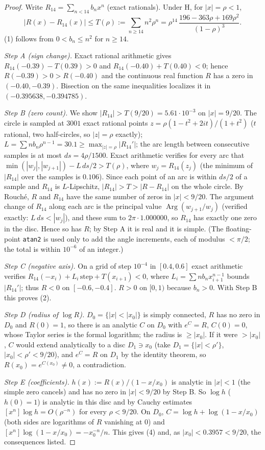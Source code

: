 \documentclass[11pt]{article}
\theoremstyle{definition}
\theoremstyle{remark}
\begin{document}
\begin{proof}
Write $R_{14}=\sum_{n<14}b_nx^n$ (exact rationals). Under H, for $|x|=\rho<1$,
\[
|R(x)-R_{14}(x)|\le T(\rho):=\sum_{n\ge14}n^2\rho^n=\rho^{14}\,\frac{196-363\rho+169\rho^2}{(1-\rho)^3}.
\]
(1) follows from $0<b_n\le n^2$ for $n\ge14$.

\emph{Step A (sign change).} Exact rational arithmetic gives $R_{14}(-0.39)-T(0.39)>0$ and $R_{14}(-0.40)+T(0.40)<0$; hence $R(-0.39)>0>R(-0.40)$ and the continuous real function $R$ has a zero in $(-0.40,-0.39)$. Bisection on
the same inequalities localizes it in $(-0.395638,-0.394785)$.

\emph{Step B (zero count).} We show $|R_{14}|>T(9/20)=5.61\cdot10^{-3}$ on $|x|=9/20$. The circle is sampled at $3001$ exact rational points $z=\rho(1-t^2+2it)/(1+t^2)$ ($t$ rational, two half-circles, so $|z|=\rho$ exactly);
$L=\sum nb_n\rho^{n-1}=30.1\ge\max_{|z|=\rho}|R_{14}'|$; the arc length between consecutive samples is at most $ds=4\rho/1500$. Exact arithmetic verifies for every arc that
$\min(|w_j|,|w_{j+1}|)-L\,ds/2>T(\rho)$, where $w_j=R_{14}(z_j)$ (the minimum of $|R_{14}|$ over the samples is $0.106$). Since each point of an arc is within $ds/2$ of a sample and $R_{14}$ is $L$-Lipschitz, $|R_{14}|>T>|R-R_{14}|$ on the whole circle.
By Rouch\'e, $R$ and $R_{14}$ have the same number of zeros in $|x|<9/20$. The argument change of $R_{14}$ along each arc is the principal value $\operatorname{Arg}(w_{j+1}/w_j)$ (verified exactly: $L\,ds<|w_j|$), and these sum to $2\pi\cdot1.000000$, so $R_{14}$ has exactly one zero in the
disc. Hence so has $R$; by Step A it is real and it is simple. (The floating-point \texttt{atan2} is used only to add the angle increments, each of modulus $<\pi/2$; the total is within $10^{-6}$ of an integer.)

\emph{Step C (negative axis).} On a grid of step $10^{-4}$ in $[0.4,0.6]$ exact arithmetic verifies $R_{14}(-x_i)+L_i\,\text{step}+T(x_{i+1})<0$, where $L_i=\sum nb_nx_{i+1}^{n-1}$ bounds $|R_{14}'|$; thus $R<0$ on $[-0.6,-0.4]$. $R>0$ on $[0,1)$ because $b_n>0$. With Step B this proves (2).

\emph{Step D (radius of $\log R$).} $D_0=\{|x|<|x_0|\}$ is simply connected, $R$ has no zero in $D_0$ and $R(0)=1$, so there is an analytic $C$ on $D_0$ with $e^{C}=R$, $C(0)=0$, whose Taylor series is the formal logarithm; the radius is $\ge|x_0|$.
If it were $>|x_0|$, $C$ would extend analytically to a disc $D_1\ni x_0$ (take $D_1=\{|x|<\rho'\}$, $|x_0|<\rho'<9/20$), and $e^{C}=R$ on $D_1$ by the identity theorem, so $R(x_0)=e^{C(x_0)}\ne0$, a contradiction.

\emph{Step E (coefficients).} $h(x):=R(x)/(1-x/x_0)$ is analytic in $|x|<1$ (the simple zero cancels) and has no zero in $|x|<9/20$ by Step B. So $\log h$ ($h(0)=1$) is analytic in this disc and by Cauchy estimates
$[x^n]\log h=O(\rho^{-n})$ for every $\rho<9/20$. On $D_0$, $C=\log h+\log(1-x/x_0)$ (both sides are logarithms of $R$ vanishing at $0$) and $[x^n]\log(1-x/x_0)=-x_0^{-n}/n$. This gives (4) and, as $|x_0|<0.3957<9/20$, the consequences listed. \qedhere
\end{proof}
\end{document}
